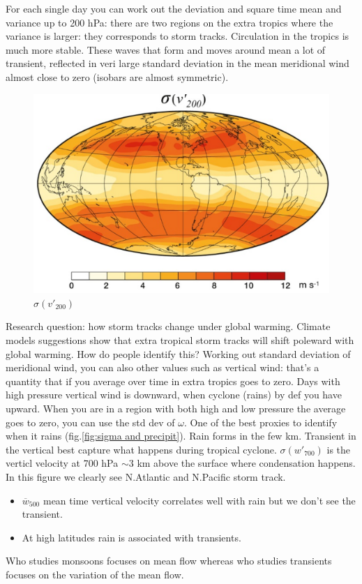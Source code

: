 For each single day you can work out the deviation and square time mean and variance up to 200 hPa: there are two regions on the extra tropics where the variance is larger: they corresponds to storm tracks. Circulation in the tropics is much more stable. These waves that form and moves around mean a lot of transient, reflected in veri large standard deviation in the mean meridional wind almost close to zero (isobars are almost symmetric). 
\begin{figure}[htpb]
    \centering
    \includegraphics[width=0.5\linewidth]{uploads/sigma v(200).png}
    \caption{$\sigma(v'_{200})$}
    \label{fig:sigma v'}
\end{figure}
Research question: how storm tracks change under global warming. Climate models suggestions show that extra tropical storm tracks will shift poleward with global warming. How do people identify this? Working out standard deviation of meridional wind, you can also other values such as vertical wind: that's a quantity that if you average over time in extra tropics goes to zero. Days with high pressure vertical wind is downward, when cyclone (rains) by def you have upward. When you are in a region with both high and low pressure the average goes to zero, you can use the std dev of $\omega$. One of the best proxies to identify when it rains (fig.\ref{fig:sigma and precipit}). Rain forms in the few km. Transient in the vertical best capture what happens during tropical cyclone. $\sigma(w'_{700})$ is the verticl velocity at $700$ hPa $\sim 3$ km above the surface where condensation happens. In this figure we clearly see N.Atlantic and N.Pacific storm track. 
\begin{itemize}
    \item $\overline{w}_{500}$ mean time vertical velocity correlates well with rain but we don't see the transient. 
    \item At high latitudes rain is associated with transients. 
\end{itemize}
Who studies monsoons focuses on mean flow whereas who studies transients focuses on the variation of the mean flow. 
